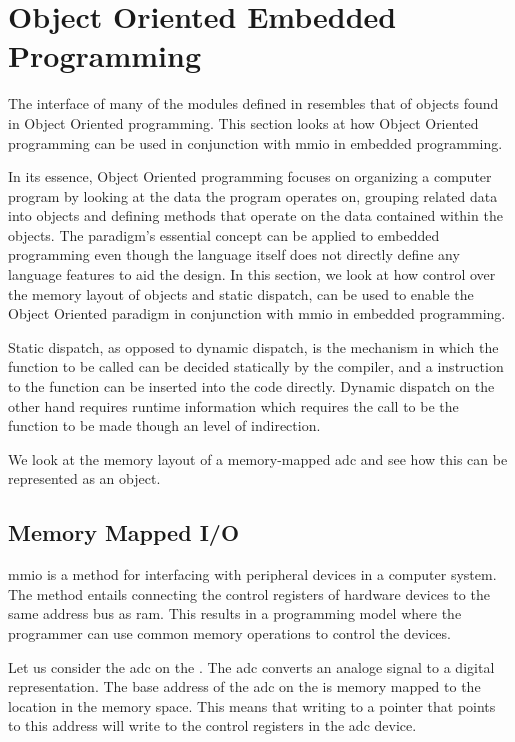 \section{Object Oriented Embedded Programming}
\label{sec:impl:oo}

The interface of many of the modules defined in {\emlib} resembles that of objects found in Object Oriented programming.
This section looks at how Object Oriented programming can be used in conjunction with \gls{mmio} in embedded programming.

In its essence, Object Oriented programming focuses on organizing a computer program by looking at the data the program operates on, grouping related data into objects and defining methods that operate on the data contained within the objects.
The paradigm's essential concept can be applied to embedded {\C} programming even though the language itself does not directly define any language features to aid the design.
In this section, we look at how control over the memory layout of objects and static dispatch, can be used to enable the Object Oriented paradigm in conjunction with \gls{mmio} in embedded programming.

Static dispatch, as opposed to dynamic dispatch, is the mechanism in which the function to be called can be decided statically by the compiler, and a  instruction to the function can be inserted into the code directly.
Dynamic dispatch on the other hand requires runtime information which requires the call to be the function to be made though an level of indirection.

We look at the memory layout of a memory-mapped \gls{adc} and see how this can be represented as an object.

\subsection{Memory Mapped I/O}
\label{ssec:memory_mapped_io}

\gls{mmio} is a method for interfacing with peripheral devices in a computer system.
The method entails connecting the control registers of hardware devices to the same address bus as \gls{ram}.
This results in a programming model where the programmer can use common memory operations to control the devices.

Let us consider the \gls{adc} on the {\gecko}.
The \gls{adc} converts an analoge signal to a digital representation.
The base address of the \gls{adc} on the {\gecko} is memory mapped to the location  in the memory space.
This means that writing to a pointer that points to this address will write to the control registers in the \gls{adc} device.

